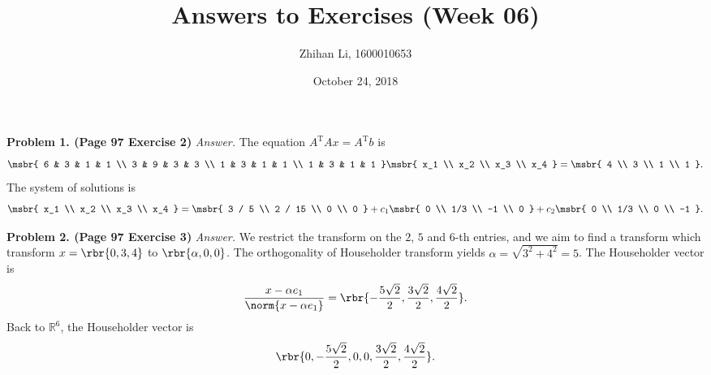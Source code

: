 \documentclass[english, nochinese]{pnote}
\title{Answers to Exercises (Week 06)}
\author{Zhihan Li, 1600010653}
\date{October 24, 2018}
\begin{document}
\maketitle

\textbf{Problem 1. (Page 97 Exercise 2)} \textit{Answer.} The equation $ A^{\text{T}} A x = A^{\text{T}} b $ is
\begin{equation}
\msbr{ 6 & 3 & 1 & 1 \\ 3 & 9 & 3 & 3 \\ 1 & 3 & 1 & 1 \\ 1 & 3 & 1 & 1 } \msbr{ x_1 \\ x_2 \\ x_3 \\ x_4 } = \msbr{ 4 \\ 3 \\ 1 \\ 1 }.
\end{equation}
The system of solutions is
\begin{equation}
\msbr{ x_1 \\ x_2 \\ x_3 \\ x_4 } = \msbr{ 3 / 5 \\ 2 / 15 \\ 0 \\ 0 } + c_1 \msbr{ 0 \\ 1/3 \\ -1 \\ 0 } + c_2 \msbr{ 0 \\ 1/3 \\ 0 \\ -1 }.
\end{equation}

\textbf{Problem 2. (Page 97 Exercise 3)} \textit{Answer.} We restrict the transform on the $2$, $5$ and $6$-th entries, and we aim to find a transform which transform $ x = \rbr{ 0, 3, 4 } $ to $ \rbr{ \alpha, 0, 0 } $. The orthogonality of Householder transform yields $ \alpha = \sqrt{ 3^2 + 4^2 } = 5 $. The Householder vector is
\begin{equation}
\frac{ x - \alpha e_1 }{\norm{ x - \alpha e_1 }} = \rbr{ -\frac{ 5 \sqrt{2} }{2}, \frac{ 3 \sqrt{2} }{2}, \frac{ 4 \sqrt{2} }{2} }.
\end{equation}
Back to $\mathbb{R}^6$, the Householder vector is
\begin{equation}
\rbr{ 0, -\frac{ 5 \sqrt{2} }{2}, 0, 0, \frac{ 3 \sqrt{2} }{2}, \frac{ 4 \sqrt{2} }{2} }.
\end{equation}
\end{document}
